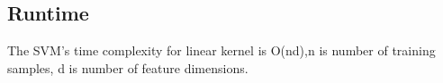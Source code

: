 \documentclass{article}
\begin{document}
\subsection{Runtime}
The SVM's time complexity for linear kernel is O(nd),n is number of training samples, d is number of feature dimensions.








%

%

\end{document}
